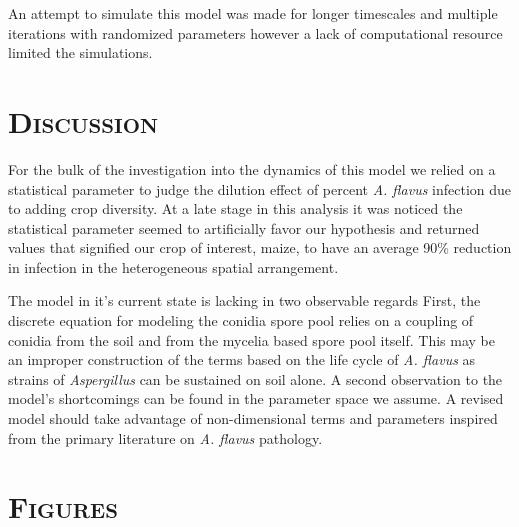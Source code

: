 \documentclass[a4paper,12pt]{article}
\begin{document}
An attempt to simulate this model was made for longer timescales and multiple iterations with randomized parameters however a lack of computational resource limited the simulations.


\section*{\upshape\textsc{Discussion}}

For the bulk of the investigation into the dynamics of this model we relied on a statistical parameter to judge the dilution effect of percent \emph{A. flavus} infection due to adding crop diversity.
At a late stage in this analysis it was noticed the statistical parameter seemed to artificially favor our hypothesis and returned values that signified our crop of interest, maize, to have an average 90\% reduction in infection in the heterogeneous spatial arrangement.

The model in it's current state is lacking in two observable regards
First, the discrete equation for modeling the conidia spore pool relies on a coupling of conidia from the soil and from the mycelia based spore pool itself.
This may be an improper construction of the terms based on the life cycle of \emph{A. flavus} as strains of \emph{Aspergillus} can be sustained on soil alone.
A second observation to the model's shortcomings can be found in the parameter space we assume.
A revised model should take advantage of non-dimensional terms and parameters inspired from the primary literature on \emph{A. flavus} pathology.


\newpage

\section*{\upshape\textsc{Figures}}
\end{document}
